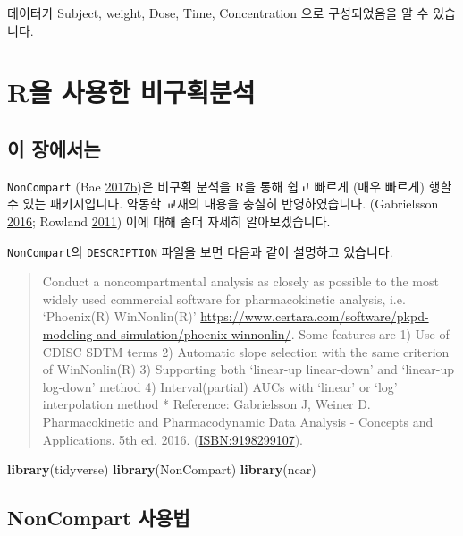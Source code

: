 \documentclass[12pt,]{krantz}
\newenvironment{Shaded}{\begin{snugshade}}{\end{snugshade}}
\newcommand{\KeywordTok}[1]{\textcolor[rgb]{0.13,0.29,0.53}{\textbf{#1}}}
\newcommand{\NormalTok}[1]{#1}
\theoremstyle{definition}
\theoremstyle{definition}
\theoremstyle{definition}
\theoremstyle{remark}
\begin{document}
데이터가 Subject, weight, Dose, Time, Concentration 으로 구성되었음을 알
수 있습니다.

\chapter{R을 사용한 비구획분석}\label{noncompart}

\section{이 장에서는}\label{summary-noncompart}

\texttt{NonCompart} (Bae
\protect\hyperlink{ref-R-NonCompart}{2017}\protect\hyperlink{ref-R-NonCompart}{b})은
비구획 분석을 R을 통해 쉽고 빠르게 (매우 빠르게) 행할 수 있는
패키지입니다. 약동학 교재의 내용을 충실히 반영하였습니다. (Gabrielsson
\protect\hyperlink{ref-gab}{2016}; Rowland
\protect\hyperlink{ref-tozer}{2011}) 이에 대해 좀더 자세히
알아보겠습니다.

\texttt{NonCompart}의 \texttt{DESCRIPTION} 파일을 보면 다음과 같이
설명하고 있습니다.

\begin{quote}
Conduct a noncompartmental analysis as closely as possible to the most
widely used commercial software for pharmacokinetic analysis, i.e.
`Phoenix(R) WinNonlin(R)'
\url{https://www.certara.com/software/pkpd-modeling-and-simulation/phoenix-winnonlin/}.
Some features are 1) Use of CDISC SDTM terms 2) Automatic slope
selection with the same criterion of WinNonlin(R) 3) Supporting both
`linear-up linear-down' and `linear-up log-down' method 4)
Interval(partial) AUCs with `linear' or `log' interpolation method *
Reference: Gabrielsson J, Weiner D. Pharmacokinetic and Pharmacodynamic
Data Analysis - Concepts and Applications. 5th ed. 2016.
(\url{ISBN:9198299107}).
\end{quote}

\begin{Shaded}
\begin{Highlighting}[]
\KeywordTok{library}\NormalTok{(tidyverse)}
\KeywordTok{library}\NormalTok{(NonCompart)}
\KeywordTok{library}\NormalTok{(ncar)}
\end{Highlighting}
\end{Shaded}

\section{NonCompart 사용법}\label{how-to-use}
\end{document}
